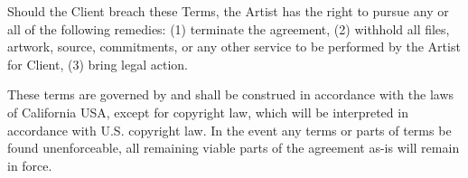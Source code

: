 \documentclass{article}
\newcommand{\hcm}[1][1]{\hspace{#1 cm}}
\begin{document}
\begin{flushleft}
\begin{center}
Should the Client breach these Terms, the Artist has the right to pursue any or all of the following remedies: (1) terminate the agreement, (2) withhold all files, artwork, source, commitments, or any other service to be performed by the Artist for Client, (3) bring legal action.\\\hcm

These terms are governed by and shall be construed in accordance with the laws of California USA, except for copyright law, which will be interpreted in accordance with U.S. copyright law. In the event any terms or parts of terms be found unenforceable, all remaining viable parts of the agreement as-is will remain in force.\\\hcm
\end{center}

\end{flushleft}
\end{document}
